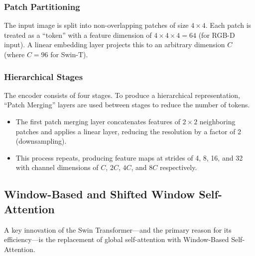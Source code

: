 \subsubsection{Patch Partitioning}
The input image is split into non-overlapping patches of size $4 \times 4$. Each patch is treated as a ``token'' with a feature dimension of $4 \times 4 \times 4 = 64$ (for RGB-D input). A linear embedding layer projects this to an arbitrary dimension $C$ (where $C=96$ for Swin-T).

\subsubsection{Hierarchical Stages}
The encoder consists of four stages. To produce a hierarchical representation, ``Patch Merging'' layers are used between stages to reduce the number of tokens.

\begin{itemize}
    \item The first patch merging layer concatenates features of $2 \times 2$ neighboring patches and applies a linear layer, reducing the resolution by a factor of 2 (downsampling).
    \item This process repeats, producing feature maps at strides of 4, 8, 16, and 32 with channel dimensions of $C$, $2C$, $4C$, and $8C$ respectively.
\end{itemize}

\subsection{Window-Based and Shifted Window Self-Attention}

A key innovation of the Swin Transformer—and the primary reason for its efficiency—is the replacement of global self-attention with Window-Based Self-Attention.

